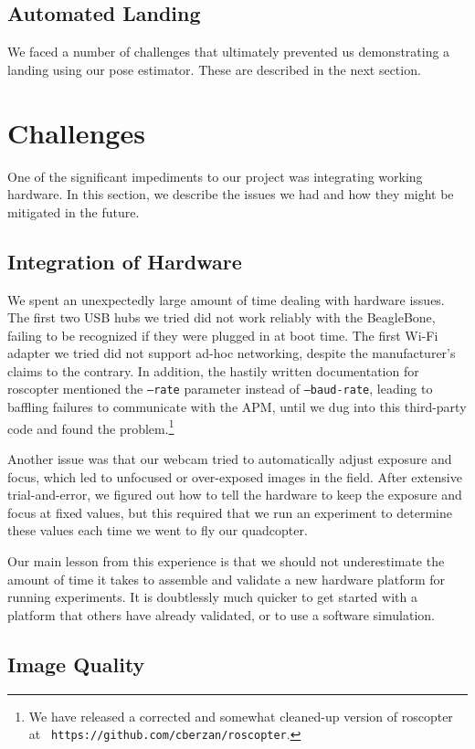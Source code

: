\documentclass[10pt]{scrartcl} %
\begin{document}
\subsection{Automated Landing}

We faced a number of challenges that ultimately prevented us demonstrating a landing using our pose estimator. These are described in the next section. 


\section{Challenges}
One of the significant impediments to our project was integrating working hardware. In this section, we describe the issues we had and how they might be mitigated in the future.

\subsection{Integration of Hardware}

We spent an unexpectedly large amount of time dealing with hardware issues. The
first two USB hubs we tried did not work reliably with the BeagleBone, failing
to be recognized if they were plugged in at boot time. The first Wi-Fi adapter
we tried did not support ad-hoc networking, despite the manufacturer's claims
to the contrary. In addition, the hastily written documentation for roscopter
mentioned the {\tt --rate} parameter instead of {\tt --baud-rate}, leading to
baffling failures to communicate with the APM, until we dug into this
third-party code and found the problem.\footnote{We have released a corrected
and somewhat cleaned-up version of roscopter at {\tt
https://github.com/cberzan/roscopter}.}

Another issue was that our webcam tried to automatically adjust exposure and
focus, which led to unfocused or over-exposed images in the field. After
extensive trial-and-error, we figured out how to tell the hardware to keep the
exposure and focus at fixed values, but this required that we run an experiment
to determine these values each time we went to fly our quadcopter.

Our main lesson from this experience is that we should not underestimate the
amount of time it takes to assemble and validate a new hardware platform for
running experiments. It is doubtlessly much quicker to get started with a
platform that others have already validated, or to use a software simulation.

\subsection{Image Quality}
\end{document}
